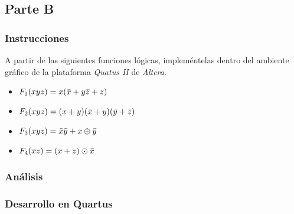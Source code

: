 \documentclass[../procedimientos.tex]{subfiles}
\begin{document}
\subsection{Parte B}
\subsubsection{Instrucciones}
A partir de las siguientes funciones lógicas, impleméntelas dentro del 
ambiente gráfico de la plataforma \textit{Quatus II} de \textit{Altera}.
\begin{itemize}
  \item $F_1 (xyz) = x (\bar{x} + y\bar{z} + z)$
  \item $F_2 (xyz) = (x + y) (\bar{x} + y) (\bar{y} + \bar{z})$
  \item $F_3 (xyz) = \bar{x}\bar{y} + x\oplus\bar{y}$
  \item $F_4 (xz)  = (x + z)\odot\bar{x}$
\end{itemize}

\subsubsection{Análisis}

\subsubsection{Desarrollo en Quartus}
\end{document}
